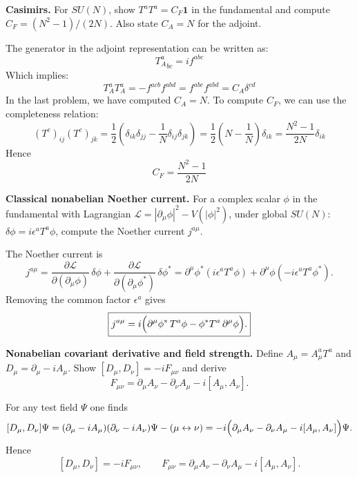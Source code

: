 \begin{problem}
    \textbf{Casimirs.} For \(SU(N)\), show \(T^aT^a=C_F\mathbf{1}\) in the fundamental and compute \(C_F=(N^2-1)/(2N)\). Also state \(C_A=N\) for the adjoint.
\end{problem}
\begin{solution}[34.2]
	The generator in the adjoint representation can be written as:
	\[
	{T_A^{a}}_{bc}=if^{abc}
	\]
	Which implies:
	\[
	T_A^aT_A^a=-f^{acb}f^{abd}=f^{abc}f^{abd}=C_A\delta^{cd}
	\]
	In the last problem, we have computed $C_A=N$. To compute $C_F$, we can use the completeness relation:
	\[
	(T^c)_{ij}(T^c)_{jk}=\frac12\left(\delta_{ik}\delta_{jj}-\frac1N\delta_{ij}\delta_{jk}\right)=\frac12\left(N-\frac1N\right)\delta_{ik}=\frac{N^2-1}{2N}\delta_{ik}
	\]
	Hence
	\[
	\boxed{
	C_F=\frac{N^2-1}{2N}
	}
	\]
\end{solution}
\begin{problem}
    \textbf{Classical nonabelian Noether current.} For a complex scalar \(\phi\) in the fundamental with Lagrangian \(\mathcal{L}=|\partial_\mu\phi|^2 - V(|\phi|^2)\), under global \(SU(N)\): \(\delta\phi=i\epsilon^a T^a\phi\), compute the Noether current \(j^{a\mu}\).
\end{problem}
\begin{solution}[34.3]
The Noether current is
	\[
	j^{a\mu}
	=\frac{\partial\mathcal L}{\partial(\partial_\mu\phi)}\,\delta\phi
	+\frac{\partial\mathcal L}{\partial(\partial_\mu\phi^*)}\,\delta\phi^*
	=\partial^\mu\phi^*(i\epsilon^aT^a\phi)+\partial^\mu\phi(-i\epsilon^aT^a\phi^*).
	\]
	Removing the common factor \(\epsilon^a\) gives
	\[
	\boxed{j^{a\mu}= i\Bigl(\partial^\mu\phi^*\,T^a\phi-\phi^* T^a\,\partial^\mu\phi\Bigr).}
	\]
\end{solution}
\begin{problem}
    \textbf{Nonabelian covariant derivative and field strength.} Define \(A_\mu=A_\mu^aT^a\) and \(D_\mu=\partial_\mu-iA_\mu\). Show \([D_\mu,D_\nu]=-iF_{\mu\nu}\) and derive
    \[
        F_{\mu\nu}=\partial_\mu A_\nu-\partial_\nu A_\mu-i[A_\mu,A_\nu].
    \]
\end{problem}
\begin{solution}[33.4]
	For any test field \(\Psi\) one finds
	\[
	[D_\mu,D_\nu]\Psi
	=(\partial_\mu-iA_\mu)(\partial_\nu-iA_\nu)\Psi-(\mu\leftrightarrow\nu)
	=-i\Bigl(\partial_\mu A_\nu-\partial_\nu A_\mu-i[A_\mu,A_\nu]\Bigr)\Psi.
	\]
	Hence
	\[
	\boxed{[D_\mu,D_\nu]=-iF_{\mu\nu},}
	\qquad
	\boxed{F_{\mu\nu}=\partial_\mu A_\nu-\partial_\nu A_\mu-i[A_\mu,A_\nu].}
	\]
\end{solution}
